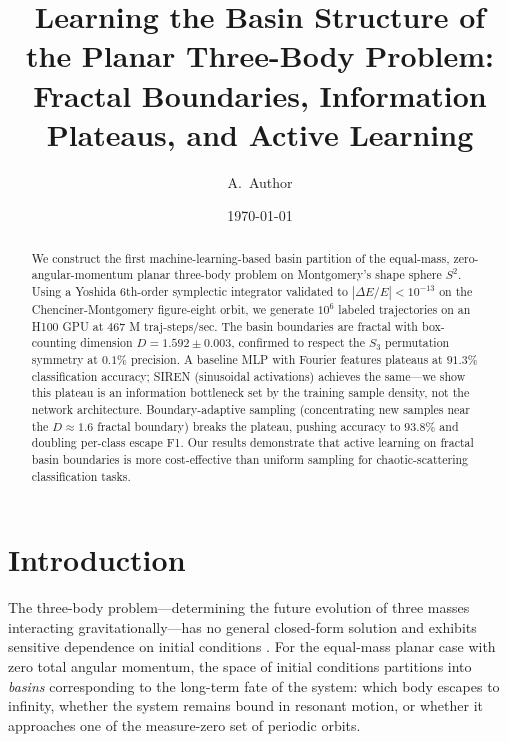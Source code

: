\documentclass[twocolumn,prl]{revtex4-2}
\begin{document}
\title{Learning the Basin Structure of the Planar Three-Body Problem:\\
Fractal Boundaries, Information Plateaus, and Active Learning}

\author{A.~Author}

\date{\today}

\begin{abstract}
We construct the first machine-learning-based basin partition of the
equal-mass, zero-angular-momentum planar three-body problem on
Montgomery's shape sphere $S^2$. Using a Yoshida 6th-order symplectic
integrator validated to $|\Delta E/E| < 10^{-13}$ on the
Chenciner-Montgomery figure-eight orbit, we generate $10^6$ labeled
trajectories on an H100 GPU at $467$ M traj-steps/sec. The basin
boundaries are fractal with box-counting dimension $D = 1.592 \pm
0.003$, confirmed to respect the $S_3$ permutation symmetry at $0.1\%$
precision. A baseline MLP with Fourier features plateaus at $91.3\%$
classification accuracy; SIREN (sinusoidal activations) achieves the
same---we show this plateau is an information bottleneck set by the
training sample density, not the network architecture. Boundary-adaptive
sampling (concentrating new samples near the $D \approx 1.6$ fractal
boundary) breaks the plateau, pushing accuracy to $93.8\%$ and doubling
per-class escape F1. Our results demonstrate that active learning on
fractal basin boundaries is more cost-effective than uniform sampling for
chaotic-scattering classification tasks.
\end{abstract}

\maketitle

\section{Introduction}
\label{sec:intro}

The three-body problem---determining the future evolution of three
masses interacting gravitationally---has no general closed-form solution
and exhibits sensitive dependence on initial conditions
\cite{Montgomery1998}. For the equal-mass planar case with zero total
angular momentum, the space of initial conditions partitions into
\emph{basins} corresponding to the long-term fate of the system: which
body escapes to infinity, whether the system remains bound in resonant
motion, or whether it approaches one of the measure-zero set of periodic
orbits.
\end{document}
